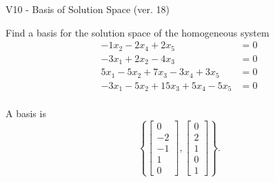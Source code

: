 \begin{exercise}
  \begin{exerciseTitle}V10 - Basis of Solution Space (ver. 18)\end{exerciseTitle}
  \begin{exerciseStatement}
    Find a basis for the solution space of the homogeneous system 
\begin{align*}
 -1 x_ 2 -2 x_ 4 + 2 x_ 5 &= 0  \\ 
  -3 x_ 1 + 2 x_ 2 -4 x_ 3 &= 0  \\ 
  5 x_ 1 -5 x_ 2 + 7 x_ 3 -3 x_ 4 + 3 x_ 5 &= 0  \\ 
  -3 x_ 1 -5 x_ 2 + 15 x_ 3 + 5 x_ 4 -5 x_ 5 &= 0  \\ 
 \end{align*}


 
  \end{exerciseStatement}

  \begin{exerciseAnswer}
   A basis is   
\[\left\{\left[\begin{array}{c}
0 \\
-2 \\
-1 \\
1 \\
0
\end{array}\right] , \left[\begin{array}{c}
0 \\
2 \\
1 \\
0 \\
1
\end{array}\right]\right\}.\]

  


  \end{exerciseAnswer}
\end{exercise}